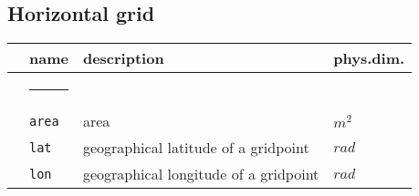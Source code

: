 %

\subsection{Horizontal grid}  
\begin{tabular}{l l l l}  
& \parbox{.15\textwidth}{name} & \parbox{.65\textwidth}{description} & 
\parbox{.1\textwidth}{phys.dim.} \\ \hline  
& \rule{4ex}{0pt} & \\[-10pt]  
 & \texttt{area}   & area & $m^2$ \\  
 & \texttt{lat}   & geographical latitude of a gridpoint & $rad$ \\  
 & \texttt{lon}   & geographical longitude of a gridpoint & $rad$ \\[5pt]
\end{tabular}  

